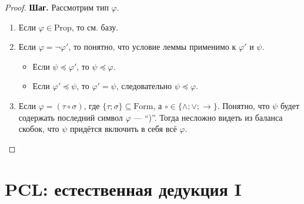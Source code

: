 \documentclass[12pt,a4paper]{article}
\newcommand{\Prop}{\ensuremath{\mathrm{Prop}}\xspace}
\newcommand{\Formul}{\ensuremath{\mathrm{Form}}\xspace}
\newcommand{\reset}{\setcounter{enumprb}{0}}
\begin{document}
\begin{enumproblem}
\begin{proof}
            \textbf{Шаг.} Рассмотрим тип $\varphi$.
            \begin{enumerate}
                \item Если $\varphi \in \Prop$, то см. базу.
                \item Если $\varphi = \neg \varphi'$, то понятно, что условие леммы применимо к $\varphi'$ и $\psi$.
                    \begin{itemize}
                        \item Если $\psi \preccurlyeq \varphi'$, то $\psi \preccurlyeq \varphi$.
                        \item Если $\varphi' \preccurlyeq \psi$, то $\varphi' = \psi$, следовательно $\psi \preccurlyeq \varphi$.
                    \end{itemize}
                \item Если $\varphi = (\tau \circ \sigma)$, где $\{\tau; \sigma\} \subseteq \Formul$, а $\circ \in \{\wedge; \vee; \rightarrow\}$. Понятно, что $\psi$ будет содержать последний символ $\varphi$ --- ``)''. Тогда несложно видеть из баланса скобок, что $\psi$ придётся включить в себя всё $\varphi$.
            \end{enumerate}
        \end{proof}
    \end{enumproblem}

    \section{PCL: естественная дедукция I}\reset
\end{document}

